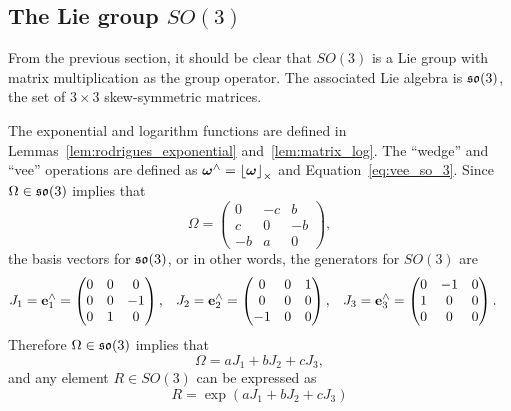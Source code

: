 

\subsection{The Lie group $SO(3)$}

From the previous section, it should be clear that $SO(3)$ is a Lie group with matrix multiplication as the group operator.  The associated Lie algebra is $\mathfrak{so}(3)$, the set of $3\times 3$ skew-symmetric matrices.

The exponential and logarithm functions are defined in Lemmas~\ref{lem:rodrigues_exponential} and~\ref{lem:matrix_log}.  The ``wedge'' and ``vee'' operations are defined as $\boldsymbol{\omega}^\wedge = \left\lfloor\boldsymbol{\omega}\right\rfloor_{\times}$ and Equation~\eqref{eq:vee_so_3}. Since $\Omega\in\mathfrak{so}(3)$ implies that
\[
\Omega = \begin{pmatrix} 0 & -c & b \\ c & 0 & -b \\ -b & a & 0 \end{pmatrix},
\]
the basis vectors for $\mathfrak{so}(3)$, or in other words, the generators for $SO(3)$ are
\begin{align*}
J_{1} & =\mathbf{e}_{1}^\wedge = \begin{pmatrix}0 & 0 & 0\\
0 & 0 & -1\\
0 & 1 & 0
\end{pmatrix}, & J_{2} &= \mathbf{e}_2^\wedge = \begin{pmatrix}0 & 0 & 1\\
0 & 0 & 0\\
-1 & 0 & 0
\end{pmatrix}, & J_{3} &= \mathbf{e}_3^\wedge = \begin{pmatrix}0 & -1 & 0\\
1 & 0 & 0\\
0 & 0 & 0
\end{pmatrix}.
\end{align*}
Therefore $\Omega\in\mathfrak{so}(3)$ implies that
\[
\Omega = aJ_1 + bJ_2 + cJ_3,
\]
and any element $R\in SO(3)$ can be expressed as
\[
R = \exp\left( aJ_1 + bJ_2 + cJ_3 \right)
\]

